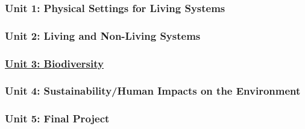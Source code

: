 \documentclass[
]{article}
\begin{document}
\hypertarget{unit-1-physical-settings-for-living-systems}{%
\subsubsection{Unit 1: Physical Settings for Living
Systems}\label{unit-1-physical-settings-for-living-systems}}

\hypertarget{unit-2-living-and-non-living-systems}{%
\subsubsection{Unit 2: Living and Non-Living
Systems}\label{unit-2-living-and-non-living-systems}}

\hypertarget{unit-3-biodiversity}{%
\subsubsection{\texorpdfstring{\href{https://docs.google.com/document/d/1Bgrb4qwGBcupsMQ1rD_0cuCFS_clIWAw1MH5NLA0IgM/edit?usp=sharing}{Unit
3: Biodiversity}}{Unit 3: Biodiversity}}\label{unit-3-biodiversity}}

\hypertarget{unit-4-sustainabilityhuman-impacts-on-the-environment}{%
\subsubsection{Unit 4: Sustainability/Human Impacts on the
Environment}\label{unit-4-sustainabilityhuman-impacts-on-the-environment}}

\hypertarget{unit-5-final-project}{%
\subsubsection{Unit 5: Final Project}\label{unit-5-final-project}}
\end{document}
